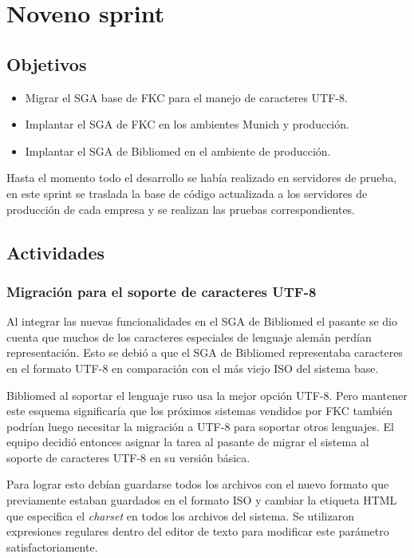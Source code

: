 ﻿\section{Noveno sprint} %
\label{sec:noveno_sprint}

\subsection{Objetivos}

\begin{itemize}
	\item Migrar el SGA base de FKC para el manejo de caracteres UTF-8.
	\item Implantar el SGA de FKC en los ambientes Munich y producción.
	\item Implantar el SGA de Bibliomed en el ambiente de producción.
\end{itemize}

Hasta el momento todo el desarrollo se había realizado en servidores de prueba, en este sprint se traslada la base de código actualizada a los servidores de producción de cada empresa y se realizan las pruebas correspondientes.

\subsection{Actividades} %
\label{sub:actividades9}

\subsubsection{Migración para el soporte de caracteres UTF-8}

Al integrar las nuevas funcionalidades en el SGA de Bibliomed el pasante se dio cuenta que muchos de los caracteres especiales de lenguaje alemán perdían representación. Esto se debió a que el SGA de Bibliomed representaba caracteres en el formato UTF-8 en comparación con el más viejo ISO del sistema base.

Bibliomed al soportar el lenguaje ruso usa la mejor opción UTF-8. Pero mantener este esquema significaría que los próximos sistemas vendidos por FKC también podrían luego necesitar la migración a UTF-8 para soportar otros lenguajes. El equipo decidió entonces asignar la tarea al pasante de migrar el sistema al soporte de caracteres UTF-8 en su versión básica.

Para lograr esto debían guardarse todos los archivos con el nuevo formato que previamente estaban guardados en el formato ISO y cambiar la etiqueta HTML que especifica el \emph{charset} en todos los archivos del sistema. Se utilizaron expresiones regulares dentro del editor de texto para modificar este parámetro satisfactoriamente.

